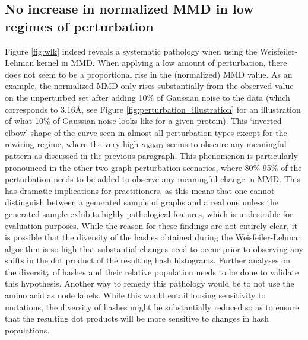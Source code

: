 \subsection{No increase in normalized MMD in low regimes of
perturbation} \label{sec:insensitivity_wl_kernel}
Figure \ref{fig:wlk} indeed reveals a systematic pathology when using the
Weisfeiler-Lehman kernel in MMD. When applying a low amount of perturbation,
there does not seem to be a proportional rise in the (normalized) MMD value. As
an example, the normalized MMD only rises substantially from the observed value
on the unperturbed set after adding 10\% of Gaussian noise to the data (which
corresponds to 3.16\si{\angstrom}, see Figure
\ref{fig:perturbation_illustration} for an illustration of what 10\% of Gaussian
noise looks like for a given protein). This `inverted elbow' shape of the curve
seen in almost all perturbation types except for the rewiring regime, where the
very high $\sigma_{\text{MMD}}$ seems to obscure any meaningful pattern as discussed in
the previous paragraph. This phenomenon is particularly pronounced in the other
two graph perturbation scenarios, where 80\%-95\% of the perturbation needs to
be added to observe any meaningful change in MMD. This has dramatic implications
for practitioners, as this means that one cannot distinguish between a generated
sample of graphs and a real one unless the generated sample exhibits highly
pathological features, which is undesirable for evaluation purposes. While the
reason for these findings are not entirely clear, it is possible that the
diversity of the hashes obtained during the Weisfeiler-Lehman algorithm is so
high that substantial changes need to occur prior to observing any shifts in the
dot product of the resulting hash histograms. Further analyses on the diversity
of hashes and their relative population needs to be done to validate this
hypothesis. Another way to remedy this pathology would be to not use the amino
acid as node labels. While this would entail loosing sensitivity to mutations,
the diversity of hashes might be substantially reduced so as to ensure that the
resulting dot products will be more sensitive to changes in hash populations.




